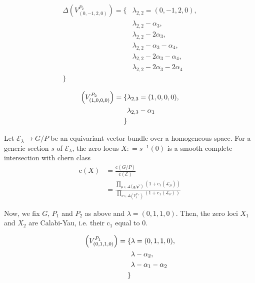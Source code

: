 \documentclass[uplatex,dvipdfmx]{jsarticle}
\newcommand{\defeq}{\mathrel{\mathop:}=}
\begin{document}
\begin{equation}
    \begin{alignedat}{2}
        \Delta\left( V^{P_2}_{(0, -1, 2, 0)} \right)
        =
        \{
            &\lambda_{2,2} = (0, -1, 2, 0),\\
            &\lambda_{2,2} - \alpha_3,\\
            &\lambda_{2,2} - 2\alpha_3,\\
            &\lambda_{2,2} - \alpha_3 -\alpha_4,\\
            &\lambda_{2,2} - 2\alpha_3 - \alpha_4,\\
            &\lambda_{2,2} - 2\alpha_3 - 2\alpha_4\\
        \}
    \end{alignedat}
\end{equation}

\begin{equation}
    \begin{alignedat}
        \Delta\left( V^{P_2}_{(1, 0, 0, 0)} \right)
        =
        \{
            &\lambda_{2,3} = (1, 0, 0, 0),\\
            &\lambda_{2,3} - \alpha_1\\
        \}
    \end{alignedat}
\end{equation}


Let
$\mathcal{E}_\lambda \to G/P$
be an equivariant vector bundle over a homogeneous space.
For a generic section
$s$
of
$\mathcal{E}_\lambda$,
the zero locus
$X \defeq s^{-1}(0)$
is a smooth complete intersection with chern class
\begin{align}
    \mathrm{c}(X)
    &=
    \frac
    {\mathrm{c}(G/P)}
    {\mathrm{c}(\mathcal{E})}\\
    &=
    \frac
    {\prod_{\mu \in \Delta(\mathfrak{g}/\mathfrak{p}^\vee)}(1+\mathrm{c}_1(\mathcal{L}_\mu))}
    {\prod_{\nu \in \Delta(V^{P\vee}_\lambda)}(1+\mathrm{c}_1(\mathcal{L}_\nu))}
\end{align}

Now, we fix
$G$,
$P_1$
and
$P_2$
as above and
$\lambda = (0, 1, 1, 0)$.
Then, the zero loci
$X_1$
and
$X_2$
are Calabi-Yau,
i.e. their
$\mathrm{c}_1$
equal to
$0$.

\begin{equation}
    \begin{alignedat}
        \Delta\left( V^{P_1}_{(0, 1, 1, 0)} \right)
        =
        \{
            &\lambda = (0, 1, 1, 0),\\
            &\lambda - \alpha_2,\\
            &\lambda - \alpha_1 - \alpha_2\\
        \}
    \end{alignedat}
\end{equation}
\end{document}
